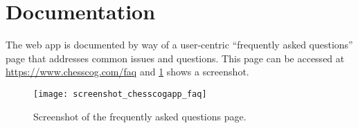 \documentclass[../../report.tex]{subfiles}
\begin{document}
\section{Documentation}
The web app is documented by way of a user-centric ``frequently asked questions'' page that addresses common issues and questions.
This page can be accessed at \url{https://www.chesscog.com/faq} and \cref{fig:chesscogapp_faq} shows a screenshot.
\begin{figure}
    \centering
    \texttt{[image: screenshot\_chesscogapp\_faq]}
    \caption{Screenshot of the frequently asked questions page.}
    \label{fig:chesscogapp_faq}
\end{figure}
\end{document}
